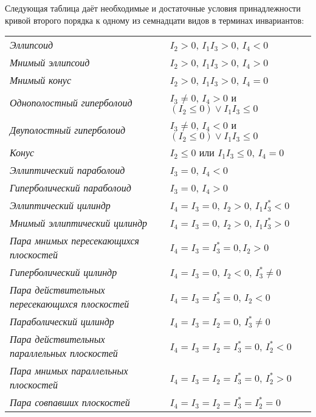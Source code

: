\begin{theorem}
    Следующая таблица даёт необходимые и достаточные условия принадлежности кривой второго порядка к одному из семнадцати видов в терминах инвариантов:

    \begin{tabular}{| l | l |}
        \hline
        \textit{Эллипсоид} & $I_2 > 0$, $I_1I_3 > 0$, $I_4 < 0$\\
        \textit{Мнимый эллипсоид} & $I_2 > 0$, $I_1I_3 > 0$, $I_4 > 0$\\
        \textit{Мнимый конус} & $I_2 > 0$, $I_1I_3 > 0$, $I_4 = 0$\\
        \textit{Однополостный гиперболоид} & $I_3 \ne 0$, $I_4 > 0$ и $(I_2 \leqslant 0) \vee I_1I_3 \leqslant 0$\\
        \textit{Двуполостный гиперболоид} & $I_3 \ne 0$, $I_4 < 0$ и $(I_2 \leqslant 0) \vee I_1I_3 \leqslant 0$\\
        \textit{Конус} & $I_2 \leqslant 0$ или $I_1I_3 \leqslant 0$, $I_4 = 0$\\
        \textit{Эллиптический параболоид} & $I_3 = 0$, $I_4 < 0$\\
        \textit{Гиперболический параболоид} & $I_3 = 0$, $I_4 > 0$\\
        \hline
        \textit{Эллиптический цилиндр} & $I_4 = I_3 = 0$, $I_2 > 0$, $I_1I_3^\ast < 0$\\
        \textit{Мнимый эллиптический цилиндр} & $I_4 = I_3 = 0$, $I_2 > 0$, $I_1I_3^\ast > 0$\\
        \textit{Пара мнимых пересекающихся плоскостей} & $I_4 = I_3 = I_3^\ast = 0, I_2 > 0$\\
        \textit{Гиперболический цилиндр} & $I_4 = I_3 = 0$, $I_2 < 0$, $I_3^\ast \ne 0$\\
        \textit{Пара действительных пересекающихся плоскостей} & $I_4 = I_3 = I_3^\ast = 0$, $I_2 < 0$\\
        \textit{Параболический цилиндр} & $I_4 = I_3 = I_2 = 0$, $I_3^\ast \ne 0$\\
        \textit{Пара действительных параллельных плоскостей} & $I_4 = I_3 = I_2 = I_3^\ast = 0$, $I_2^\ast < 0$\\
        \textit{Пара мнимых параллельных плоскостей} & $I_4 = I_3 = I_2 = I_3^\ast = 0$, $I_2^\ast > 0$\\
        \textit{Пара совпавших плоскостей} & $I_4 = I_3 = I_2 = I_3^\ast = I_2^\ast = 0$\\
        \hline
    \end{tabular}
\end{theorem}

